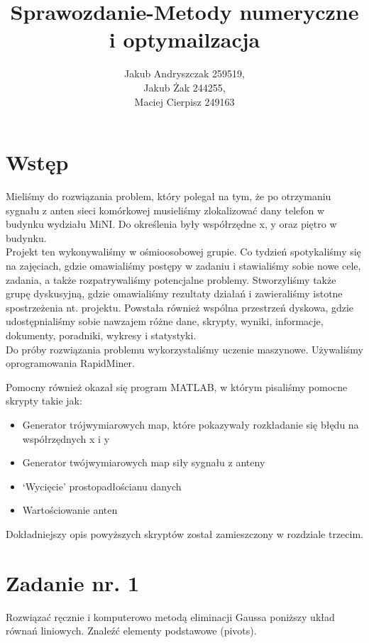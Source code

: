 \documentclass{article}
\begin{document}
\title{Sprawozdanie-Metody numeryczne i optymailzacja}
\author{Jakub Andryszczak 259519,\\ Jakub Żak 244255,\\ Maciej Cierpisz 249163}
\date{}
\maketitle
\tableofcontents
\newpage
\section{Wstęp}
Mieliśmy do rozwiązania problem, który polegał na tym, że po otrzymaniu sygnału z anten sieci komórkowej musieliśmy zlokalizować dany telefon w budynku wydziału MiNI. Do określenia były współrzędne x, y oraz piętro w budynku.\\

Projekt ten wykonywaliśmy w ośmioosobowej grupie. Co tydzień spotykaliśmy się na zajęciach, gdzie omawialiśmy postępy w zadaniu i stawialiśmy sobie nowe cele, zadania, a także rozpatrywaliśmy potencjalne problemy. Stworzyliśmy także grupę dyskusyjną, gdzie omawialiśmy rezultaty działań i zawieraliśmy istotne spostrzeżenia nt. projektu. Powstała również wspólna przestrzeń dyskowa, gdzie udostępnialiśmy sobie nawzajem różne dane, skrypty, wyniki, informacje, dokumenty, poradniki, wykresy i statystyki.\\

Do próby rozwiązania problemu wykorzystaliśmy uczenie maszynowe. Używaliśmy oprogramowania RapidMiner.

Pomocny również okazał się program MATLAB, w którym pisaliśmy pomocne skrypty takie jak:\\%
\begin{itemize}
\item Generator trójwymiarowych map, które pokazywały rozkładanie się błędu na współrzędnych x i y
\item Generator twójwymiarowych map siły sygnału z anteny
\item `Wycięcie' prostopadłościanu danych
\item Wartościowanie anten
\end{itemize}
Dokładniejszy opis powyższych skryptów został zamieszczony w rozdziale trzecim. 


\section{Zadanie nr. 1}
Rozwiązać ręcznie i komputerowo metodą eliminacji Gaussa poniższy układ równań
liniowych. Znaleźć elementy podstawowe (pivots).
\end{document}
